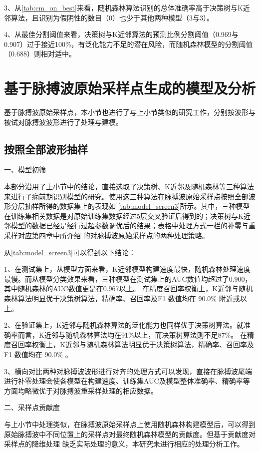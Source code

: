 3、从\autoref{tab:cm_on_best}来看，随机森林算法识别的总体准确率高于决策树与K近邻算法，且识别为假阴性的数目（0）也少于其他两种模型（3与3）。

4、从最佳分割阈值来看，决策树与K近邻算法的预测比例分割阈值（0.969与0.907）过于接近100\%，有泛化能力不足的潜在风险，而随机森林模型的分割阈值（0.688）则相对适中。

\section{基于脉搏波原始采样点生成的模型及分析}

基于脉搏波原始采样点，本小节也进行了与上小节类似的研究工作，分别按波形与被试对脉搏波波形进行了处理与建模。

\subsection{按照全部波形抽样}

一、模型初筛

本部分沿用了上小节中的结论，直接选取了决策树、K近邻及随机森林等三种算法来进行子痫前期识别模型的研究。使用这三种算法在脉搏波原始采样点按照全部波形分层抽样所得的数据集上的表现如
\autoref{tab:model_screen3}所示。其中，三种模型在训练集相关数据是对原始训练集数据经过5层交叉验证后得到的；决策树与K近邻模型的数据已经是经行过超参数调优后的结果；表格中处理方式一栏的补零与重采样对应第四章中所介绍
的对脉搏波原始采样点的两种处理策略。

从\autoref{tab:model_screen3}可以得到以下结论：

1、在测试集上，从模型方面来看，K近邻模型构建速度最快，随机森林处理速度最慢。而从模型分类效果来看，三种模型在测试集上的AUC数值均超过了0.900，其中随机森林的AUC数值更是在0.967以上。
在精度­召回率权衡上，K近邻与随机森林算法明显优于决策树算法，精确率、召回率及F1 数值均在 90.0\% 附近或以上。

2、在验证集上，K近邻与随机森林算法的泛化能力也同样优于决策树算法。就准确率而言，K近邻与随机森林算法均在91\%以上，而决策树算法则不足87\%。
在精度­召回率权衡上，K近邻与随机森林算法明显优于决策树算法，精确率、召回率及F1 数值均在 90.0\% 。

3、横向对比两种对脉搏波波形进行对齐的处理方式可以发现，直接在脉搏波尾端进行补零处理会使各模型在构建速度、训练集AUC及模型整体准确率、精确率等方面均略微优于对脉搏波重采样处理的相应数据。

二、采样点贡献度

与上小节中处理类似，在脉搏波原始采样点上使用随机森林构建模型后，可以得到
原始脉搏波中不同位置上的采样点对最终随机森林模型的贡献度。但基于贡献度对采样点的降维处理
缺乏实际处理的意义，本研究未进行相应的处理分析工作。

